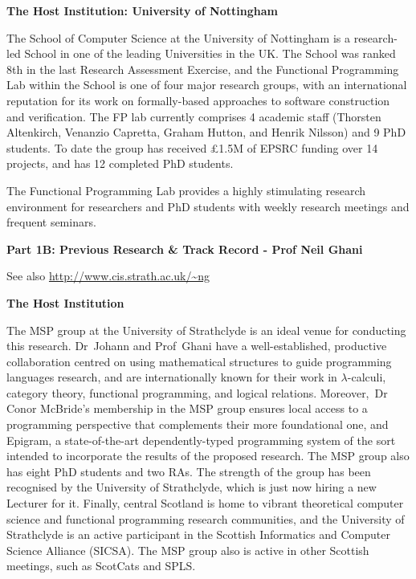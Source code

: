 \documentclass[a4paper,11pt]{article}
\begin{document}
\noindent
{\bf \Large The Host Institution: University of Nottingham}

\vspace*{0.05in}
The School of Computer Science at the University of Nottingham
is a research-led School in one of the leading Universities in
the UK. The School was ranked 8th in the last Research Assessment
Exercise, and the Functional Programming Lab within the School is
one of four major research groups, with an international reputation
for its work on formally-based approaches to software construction
and verification.  The FP lab currently comprises 4 academic staff
(Thorsten Altenkirch, Venanzio Capretta, Graham Hutton, and Henrik
Nilsson) and 9 PhD students.  To date the
group has received \pounds 1.5M of EPSRC funding over 14 projects,
and has 12 completed PhD students.

The Functional Programming Lab provides a highly stimulating
research environment for researchers and PhD students with weekly
research meetings and frequent seminars. 
\noindent


\pagebreak

\noindent
{\bf \Large Part 1B: Previous Research \& Track Record -
Prof Neil Ghani}

\vspace{0.05in}

\noindent
See also \url{http://www.cis.strath.ac.uk/~ng}

\noindent
{\bf \Large The Host Institution} 

\vspace*{0.05in}

\noindent
The MSP group at the University of Strathclyde is an ideal venue for
conducting this research. Dr~Johann and Prof~Ghani have a
well-established, productive collaboration centred on using
mathematical structures to guide programming languages research, and
are internationally known for their work in $\lambda$-calculi,
category theory, functional programming, and logical
relations. Moreover,~Dr Conor McBride's membership in the MSP group
ensures local access to a programming perspective that
complements their more foundational one, and Epigram, a state-of-the-art
dependently-typed programming system of the sort intended to
incorporate the results of the proposed research. The MSP group also has
eight PhD students and two RAs.  The strength of the group has
been recognised by the University of Strathclyde, which is just now
hiring a new Lecturer for it.  Finally, central Scotland is home to
vibrant theoretical computer science and functional programming
research communities, and the University of Strathclyde is an active
participant in the Scottish Informatics and Computer Science Alliance
(SICSA). The MSP group also is active in other Scottish meetings, such
as ScotCats and SPLS.
\end{document}
